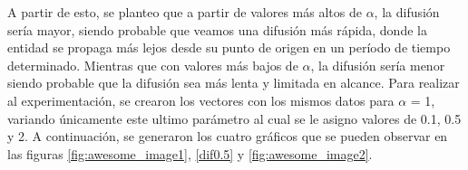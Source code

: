 A partir de esto, se planteo que a partir de valores más altos de $\alpha$, la difusión sería mayor, siendo probable que veamos una difusión más rápida, donde la entidad se propaga más lejos desde su punto de origen en un período de tiempo determinado.
Mientras que con valores más bajos de $\alpha$, la difusión sería menor siendo probable que la difusión sea más lenta y limitada en alcance.
Para realizar al experimentación, se crearon los vectores con los mismos datos para $\alpha$ = 1, variando únicamente este ultimo parámetro al cual se le asigno valores de 0.1, 0.5 y 2.
A continuación, se generaron los cuatro gráficos que se pueden observar en las figuras \ref{fig:awesome_image1}, \ref{dif0.5} y \ref{fig:awesome_image2}.

